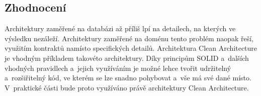 \subsection{Zhodnocení}

Architektury zaměřené na databázi až příliš lpí na detailech,
na kterých ve výsledku nezáleží.
Architektury zaměřené na doménu tento problém naopak řeší,
využitím kontraktů namísto specifických detailů.
Architektura Clean Architecture je vhodným příkladem takovéto architektury.
Díky principům SOLID a~dalších vhodných pravidlech a~jejich využíváním
je možné lehce tvořit udržitelný a~rozšiřitelný kód,
ve kterém se lze snadno pohybovat a~vše má své dané místo.
V~praktické části bude proto využíváno právě architektury Clean Architecture.
